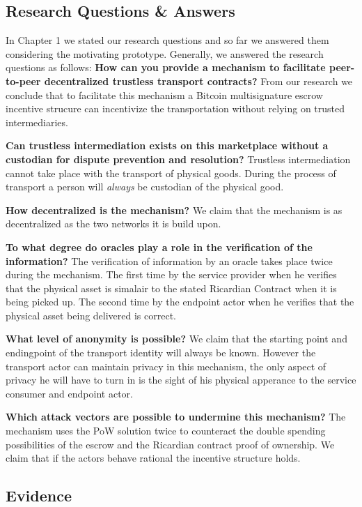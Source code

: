 \subsection{Research Questions \& Answers}

In Chapter 1 we stated our research questions and so far we answered them considering the motivating prototype. Generally, we answered the research questions as follows:
\bigbreak
\noindent \textbf{How can you provide a mechanism to facilitate peer-to-peer decentralized trustless transport contracts?} From our research we conclude that to facilitate this mechanism a Bitcoin multisignature escrow incentive strucure can incentivize the transportation without relying on trusted intermediaries.

\bigbreak
\noindent \textbf{Can trustless intermediation exists on this marketplace without a custodian for dispute prevention and resolution?} Trustless intermediation cannot take place with the transport of physical goods. During the process of transport a person will \textit{always} be custodian of the physical good.

\bigbreak
\noindent \textbf{How decentralized is the mechanism?} We claim that the mechanism is as decentralized as the two networks it is build upon.

\bigbreak
\noindent \textbf{To what degree do oracles play a role in the verification of the information?} The verification of information by an oracle takes place twice during the mechanism. The first time by the service provider when he verifies that the physical asset is simalair to the stated Ricardian Contract when it is being picked up. The second time by the endpoint actor when he verifies that the physical asset being delivered is correct.

\bigbreak
\noindent \textbf{What level of anonymity is possible?} We claim that the starting point and endingpoint of the transport identity will always be known. However the transport actor can maintain privacy in this mechanism, the only aspect of privacy he will have to turn in is the sight of his physical apperance to the service consumer and endpoint actor.

\bigbreak
\noindent \textbf{Which attack vectors are possible to undermine this mechanism?} The mechanism uses the PoW solution twice to counteract the double spending possibilities of the escrow and the Ricardian contract proof of ownership. We claim that if the actors behave rational the incentive structure holds.

\subsection{Evidence}
